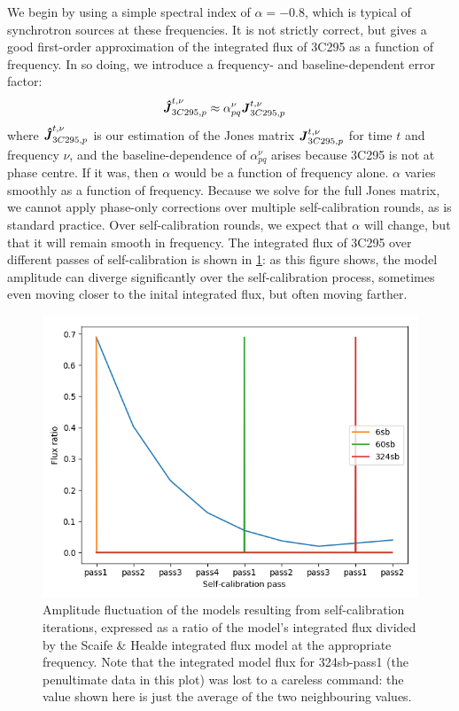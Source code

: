 \pg
We begin by using a simple spectral index of $\alpha=-0.8$, which is typical of synchrotron sources at these frequencies. It is not strictly correct, but gives a good first-order approximation of the integrated flux of 3C295 as a function of frequency. In so doing, we introduce a frequency- and baseline-dependent error factor:
\begin{align}
\textbf{\emph{\^{J}}}_{3C295,p}^{t,\nu} &\approx \alpha_{pq}^\nu \textbf{\emph{J}}_{3C295,p}^{t,\nu}
\end{align}
where $\textbf{\emph{\^{J}}}_{3C295,p}^{t,\nu}$ is our estimation of the Jones matrix $\textbf{\emph{J}}_{3C295,p}^{t,\nu}$ for time $t$ and frequency $\nu$, and the baseline-dependence of $\alpha_{pq}^\nu$ arises because 3C295 is not at phase centre. If it was, then $\alpha$ would be a function of frequency alone. $\alpha$ varies smoothly as a function of frequency. 
Because we solve for the full Jones matrix, we cannot apply phase-only corrections over multiple self-calibration rounds, as is standard practice. Over self-calibration rounds, we expect that $\alpha$ will change, but that it will remain smooth in frequency. The integrated flux of 3C295 over different passes of self-calibration is shown in \cref{fig.SC.ampfluct}: as this figure shows, the model amplitude can diverge significantly over the self-calibration process, sometimes even moving closer to the inital integrated flux, but often moving farther. 

\begin{figure}[h]
\includegraphics[width=0.8\linewidth]{images/AmpFluct.png}
\caption{\label{fig.SC.ampfluct} Amplitude fluctuation of the models resulting from self-calibration iterations, expressed as a ratio of the model's integrated flux divided by the Scaife \& Healde integrated flux model at the appropriate frequency. Note that the integrated model flux for 324sb-pass1 (the penultimate data in this plot) was lost to a careless command: the value shown here is just the average of the two neighbouring values.}
\end{figure}

